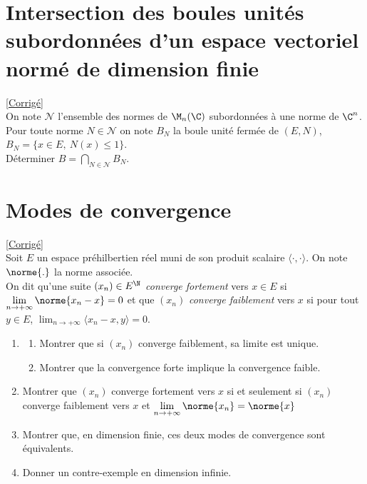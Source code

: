 \documentclass{book}
\begin{document}
	\section{Intersection des boules unités subordonnées d'un espace vectoriel normé de dimension finie}
	\textcolor{blue}{\hyperref[sec:intersection-des-boules-unites-subordonnees-dun-espace-vectoriel-norme-de-dimension-finie]{[Corrigé]}}\\
	\label{Intersection des boules unités subordonnées d'un espace vectoriel normé de dimension finie}
	On note $\mathcal N$ l'ensemble des normes de $\M_n(\C)$ subordonnées à une norme de $\C^n$. Pour toute norme $N\in \mathcal N$ on note $B_N$ la boule unité fermée de $(E,N)$, $B_N=\{x\in E,\ N(x)\leq 1\}$.\\
	Déterminer $B=\displaystyle\bigcap_{N\in \mathcal N}B_N$.
	
	\section{Modes de convergence}
	\textcolor{blue}{\hyperref[sec:modes-de-convergence]{[Corrigé]}}\\
	\label{Modes de convergence}
	Soit $E$ un espace préhilbertien réel muni de son produit scalaire $\langle\cdot,\cdot\rangle$. On note $\norme{.}$ la norme associée.
	\\On dit qu'une suite $(x_n)\in E^\N$ \textit{converge fortement} vers $x\in E$ si $\displaystyle\lim_{n\to+\infty}\norme{x_n-x}=0$ et que $(x_n)$ \textit{converge faiblement} vers $x$ si pour tout $y\in E$, $\displaystyle\lim_{n\to+\infty}\langle x_n-x,y\rangle=0$.
	\begin{enumerate}
		\item
		\begin{enumerate}[label=\alph*.]
			\item Montrer que si $(x_n)$ converge faiblement, sa limite est unique.
			\item Montrer que la convergence forte implique la convergence faible.
		\end{enumerate}
		\item Montrer que $(x_n)$ converge fortement vers $x$ si et seulement si $(x_n)$ converge faiblement vers $x$ et $\displaystyle\lim_{n\to+\infty}\norme{x_n}=\norme{x}$
		\item Montrer que, en dimension finie, ces deux modes de convergence sont équivalents.
		\item Donner un contre-exemple en dimension infinie.
	\end{enumerate}
	
\end{document}
